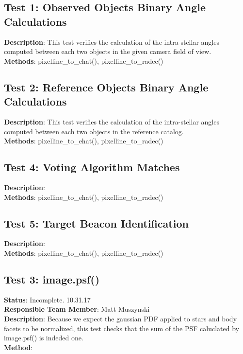 \documentclass[]{DINOReportMemo}
\begin{document}
\subsection{Test 1: Observed Objects Binary Angle Calculations}
\textbf{Description}: This test verifies the calculation of the intra-stellar angles computed between each two objects in the given camera field of view.\\
\textbf{Methods}: pixelline\_to\_ehat(), pixelline\_to\_radec()\\

\subsection{Test 2: Reference Objects Binary Angle Calculations}
\textbf{Description}: This test verifies the calculation of the intra-stellar angles computed between each two objects in the reference catalog.\\
\textbf{Methods}: pixelline\_to\_ehat(), pixelline\_to\_radec()\\

\subsection{Test 4: Voting Algorithm Matches}
\textbf{Description}: \\
\textbf{Methods}: pixelline\_to\_ehat(), pixelline\_to\_radec()\\

\subsection{Test 5: Target Beacon Identification}
\textbf{Description}: \\
\textbf{Methods}: pixelline\_to\_ehat(), pixelline\_to\_radec()\\

\newpage

\subsection{Test 3: image.psf()}
\textbf{Status}: Incomplete. 10.31.17\\
\textbf{Responsible Team Member}: Matt Muszynski \\
\textbf{Description}: Because we expect the gaussian PDF applied to stars and body facets to be normalized, this test checks that the sum of the PSF caluclated by image.psf() is indeded one.\\
\textbf{Method}: \\
\end{document}
